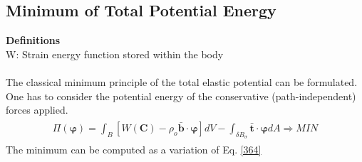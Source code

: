 \documentclass[12pt,3p]{article}
\numberwithin{equation}{section}
\begin{document}
\subsection{Minimum of Total Potential Energy}
\textbf{Definitions} \\
W: Strain energy function stored within the body  \\ \\
The classical minimum principle of the total elastic potential can be formulated. One has to consider the potential energy of the conservative (path-independent) forces applied. 
\begin{align}\label{364}
\begin{split}
\Pi (\pmb{\varphi}) = \int_{B} [ W (\mathbf{C}) - \rho_o \bar{\mathbf{b}} \cdot \pmb{\varphi}] dV - \int_{\delta B_\sigma} \mathbf{\bar{t}} \cdot \pmb{\varphi} dA \Rightarrow MIN
\end{split}
\end{align}
The minimum can be computed as a variation of Eq. \ref{364}
\begin{align}\label{365}
\begin{split}
\end{split}
\end{align}

\begin{align}
\begin{split}
\end{split}
\end{align}

\begin{align}
\begin{split}
\end{split}
\end{align}
\end{document}
